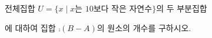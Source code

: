 전체집합 $U=\{x \mid x$는 $10$보다 작은 자연수$\}$의 두 부분집합\par\smallskip{}\par{}\par\smallskip\noindent 에 대하여 집합 $\comp{(B-A)}$의 원소의 개수를 구하시오.
